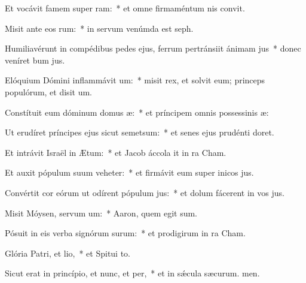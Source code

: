 \item Et vocávit famem super ram:~* et omne firmaméntum nis convit.
\item Misit ante eos rum:~* in servum venúmda est seph.
\item Humiliavérunt in compédibus pedes ejus, ferrum pertránsiit ánimam jus~* donec veníret bum jus.
\item Elóquium Dómini inflammávit um:~* misit rex, et solvit eum; princeps populórum, et disit um.
\item Constítuit eum dóminum domus æ:~* et príncipem omnis possessinis æ:
\item Ut erudíret príncipes ejus sicut semetsum:~* et senes ejus prudénti doret.
\item Et intrávit Israël in Ætum:~* et Jacob áccola it in ra Cham.
\item Et auxit pópulum suum veheter:~* et firmávit eum super inicos jus.
\item Convértit cor eórum ut odírent pópulum jus:~* et dolum fácerent in vos jus.
\item Misit Móysen, servum um:~* Aaron, quem egit sum.
\item Pósuit in eis verba signórum surum:~* et prodigirum in ra Cham.
\item Glória Patri, et lio,~* et Spitui to.
\item Sicut erat in princípio, et nunc, et per,~* et in sǽcula sæcurum. men.
